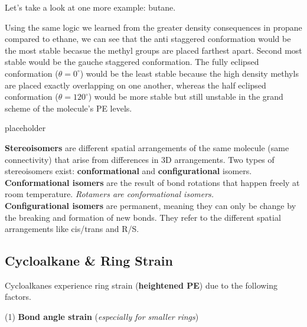 \documentclass[10pt]{article}
\begin{document}
  Let's take a look at one more example: butane.


  Using the same logic we learned from the greater  density consequences in propane compared to ethane, we can see that the anti staggered conformation would be the most stable becasue the methyl groups are placed farthest apart. Second most stable would be the gauche staggered conformation. The fully eclipsed conformation ($\theta = 0^{\circ}$) would be the least stable because the high  density methyls are placed exactly overlapping on one another, whereas the half eclipsed conformation ($\theta = 120^{\circ}$) would be more stable but still unstable in the grand scheme of the molecule's PE levels.


  \begin{definition}[label=filler1]{placeholder}

    \textbf{Stereoisomers} are different spatial arrangements of the same molecule (same connectivity) that arise from differences in 3D arrangements. Two types of stereoisomers exist: \textbf{conformational} and \textbf{configurational} isomers. \\

    \textbf{Conformational isomers} are the result of bond rotations that happen freely at room temperature. \textit{Rotamers are conformational isomers.} \\

    \textbf{Configurational isomers} are permanent, meaning they can only be change by the breaking and formation of new bonds. They refer to the different spatial arrangements like cis/trans and R/S.

  \end{definition}

\subsection{Cycloalkane \& Ring Strain}

  Cycloalkanes experience ring strain (\textbf{heightened PE}) due to the following factors.

  (1) \textbf{Bond angle strain} (\textit{especially for smaller rings})

\end{document}
